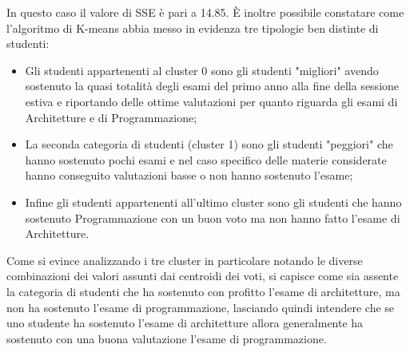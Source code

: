 \documentclass[12pt]{article}
\begin{document}
In questo caso il valore di SSE è pari a 14.85. È inoltre possibile constatare come l'algoritmo di K-means abbia messo in evidenza tre tipologie ben distinte di studenti:
\begin{itemize}
	\item Gli studenti appartenenti al cluster 0 sono gli studenti "migliori" a\-vendo sostenuto la quasi totalità degli esami del primo anno alla fine della sessione estiva e riportando delle ottime valutazioni per quanto riguarda gli esami di Architetture e di Programmazione;
	\item La seconda categoria di studenti (cluster 1) sono gli studenti "peg\-giori" che hanno sostenuto pochi esami e nel caso specifico delle materie considerate hanno conseguito valutazioni basse o non hanno sostenuto l'esame;
	\item Infine gli studenti appartenenti all'ultimo cluster sono gli studenti che hanno sostenuto Programmazione con un buon voto ma non hanno fatto l'esame di Architetture.
\end{itemize}
Come si evince analizzando i tre cluster in particolare notando le diverse combinazioni dei valori assunti dai centroidi dei voti, si capisce come sia assente la categoria di studenti che ha sostenuto con profitto l'esame di architetture, ma non ha sostenuto l'esame di programmazione,
lasciando quindi intendere che se uno studente ha sostenuto l'esame di architetture allora generalmente ha sostenuto con una buona valutazione l'esame di programmazione.
\end{document}
